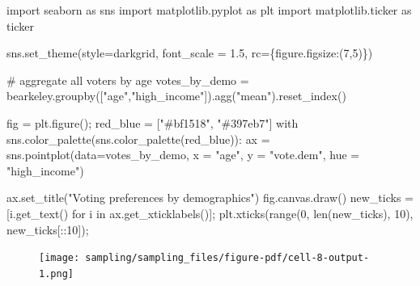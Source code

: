 \documentclass[
  letterpaper,
  DIV=11,
  numbers=noendperiod]{scrreprt}
\newenvironment{Shaded}{\begin{snugshade}}{\end{snugshade}}
\newcommand{\BuiltInTok}[1]{\textcolor[rgb]{0.00,0.23,0.31}{#1}}
\newcommand{\CommentTok}[1]{\textcolor[rgb]{0.37,0.37,0.37}{#1}}
\newcommand{\ControlFlowTok}[1]{\textcolor[rgb]{0.00,0.23,0.31}{#1}}
\newcommand{\DecValTok}[1]{\textcolor[rgb]{0.68,0.00,0.00}{#1}}
\newcommand{\FloatTok}[1]{\textcolor[rgb]{0.68,0.00,0.00}{#1}}
\newcommand{\ImportTok}[1]{\textcolor[rgb]{0.00,0.46,0.62}{#1}}
\newcommand{\KeywordTok}[1]{\textcolor[rgb]{0.00,0.23,0.31}{#1}}
\newcommand{\NormalTok}[1]{\textcolor[rgb]{0.00,0.23,0.31}{#1}}
\newcommand{\OperatorTok}[1]{\textcolor[rgb]{0.37,0.37,0.37}{#1}}
\newcommand{\StringTok}[1]{\textcolor[rgb]{0.13,0.47,0.30}{#1}}
\begin{document}
\begin{Shaded}
\begin{Highlighting}[]
\ImportTok{import}\NormalTok{ seaborn }\ImportTok{as}\NormalTok{ sns}
\ImportTok{import}\NormalTok{ matplotlib.pyplot }\ImportTok{as}\NormalTok{ plt}
\ImportTok{import}\NormalTok{ matplotlib.ticker }\ImportTok{as}\NormalTok{ ticker}

\NormalTok{sns.set\_theme(style}\OperatorTok{=}\StringTok{\textquotesingle{}darkgrid\textquotesingle{}}\NormalTok{, font\_scale }\OperatorTok{=} \FloatTok{1.5}\NormalTok{,}
\NormalTok{              rc}\OperatorTok{=}\NormalTok{\{}\StringTok{\textquotesingle{}figure.figsize\textquotesingle{}}\NormalTok{:(}\DecValTok{7}\NormalTok{,}\DecValTok{5}\NormalTok{)\})}

\CommentTok{\# aggregate all voters by age}
\NormalTok{votes\_by\_demo }\OperatorTok{=}\NormalTok{ bearkeley.groupby([}\StringTok{"age"}\NormalTok{,}\StringTok{"high\_income"}\NormalTok{]).agg(}\StringTok{"mean"}\NormalTok{).reset\_index()}

\NormalTok{fig }\OperatorTok{=}\NormalTok{ plt.figure()}\OperatorTok{;}
\NormalTok{red\_blue }\OperatorTok{=}\NormalTok{ [}\StringTok{"\#bf1518"}\NormalTok{, }\StringTok{"\#397eb7"}\NormalTok{]}
\ControlFlowTok{with}\NormalTok{ sns.color\_palette(sns.color\_palette(red\_blue)):}
\NormalTok{    ax }\OperatorTok{=}\NormalTok{ sns.pointplot(data}\OperatorTok{=}\NormalTok{votes\_by\_demo, x }\OperatorTok{=} \StringTok{"age"}\NormalTok{, y }\OperatorTok{=} \StringTok{"vote.dem"}\NormalTok{, hue }\OperatorTok{=} \StringTok{"high\_income"}\NormalTok{)}

\NormalTok{ax.set\_title(}\StringTok{"Voting preferences by demographics"}\NormalTok{)}
\NormalTok{fig.canvas.draw()}
\NormalTok{new\_ticks }\OperatorTok{=}\NormalTok{ [i.get\_text() }\ControlFlowTok{for}\NormalTok{ i }\KeywordTok{in}\NormalTok{ ax.get\_xticklabels()]}\OperatorTok{;}
\NormalTok{plt.xticks(}\BuiltInTok{range}\NormalTok{(}\DecValTok{0}\NormalTok{, }\BuiltInTok{len}\NormalTok{(new\_ticks), }\DecValTok{10}\NormalTok{), new\_ticks[::}\DecValTok{10}\NormalTok{])}\OperatorTok{;}
\end{Highlighting}
\end{Shaded}

\begin{figure}[H]

{\centering \texttt{[image: sampling/sampling\_files/figure-pdf/cell-8-output-1.png]}

}

\end{figure}
\end{document}
